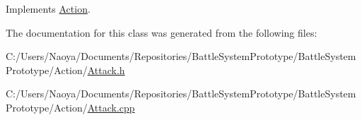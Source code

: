 Implements \hyperlink{class_action_aac84ff5e2103bbe0067df14b4a302a1d}{Action}.



The documentation for this class was generated from the following files\+:\begin{DoxyCompactItemize}
\item 
C\+:/\+Users/\+Naoya/\+Documents/\+Repositories/\+Battle\+System\+Prototype/\+Battle\+System\+Prototype/\+Action/\hyperlink{_attack_8h}{Attack.\+h}\item 
C\+:/\+Users/\+Naoya/\+Documents/\+Repositories/\+Battle\+System\+Prototype/\+Battle\+System\+Prototype/\+Action/\hyperlink{_attack_8cpp}{Attack.\+cpp}\end{DoxyCompactItemize}

